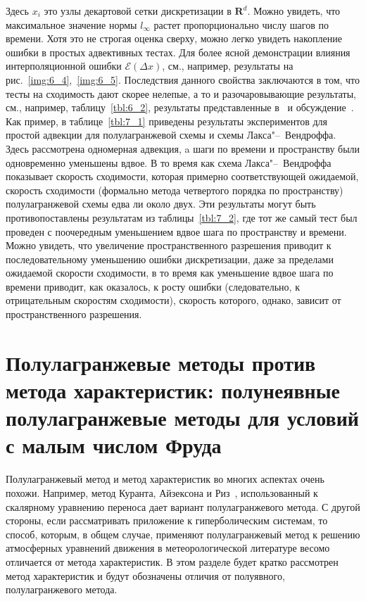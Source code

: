%
Здесь $x_i$ это узлы декартовой сетки дискретизации в $\mathbf{R}^d$. Можно увидеть, что максимальное значение нормы $l_{\infty}$ растет пропорционально числу шагов по времени. Хотя это не строгая оценка сверху, можно легко увидеть накопление ошибки в простых адвективных тестах. Для более ясной демонстрации влияния интерполяционной ошибки $\mathcal{E}(\Delta x)$, см., например, результаты на рис.~\ref{img:6_4},~\ref{img:6_5}. Последствия данного свойства заключаются в том, что тесты на сходимость дают скорее нелепые, а то и разочаровывающие результаты, см., например, таблицу~\ref{tbl:6_2}, результаты представленные в~\cite{A16} и обсуждение~\cite{A26}. Как пример, в таблице~\ref{tbl:7_1} приведены результаты экспериментов для простой адвекции для полулагранжевой схемы и схемы Лакса"--~Вендроффа. Здесь рассмотрена одномерная адвекция, a шаги по времени и пространству были одновременно уменьшены вдвое. В то время как схема Лакса"--~Вендроффа показывает скорость сходимости, которая примерно соответствующей ожидаемой, скорость сходимости (формально метода четвертого порядка по пространству) полулагранжевой схемы едва ли около двух. Эти результаты могут быть противопоставлены результатам из таблицы~\ref{tbl:7_2}, где тот же самый тест был проведен с поочередным уменьшением вдвое шага по пространству и времени. Можно увидеть, что увеличение пространственного разрешения приводит к последовательному уменьшению ошибки дискретизации, даже за пределами ожидаемой скорости сходимости, в то время как уменьшение вдвое шага по времени приводит, как оказалось, к росту ошибки (следовательно, к отрицательным скоростям сходимости), скорость которого, однако, зависит от пространственного разрешения.
\chapter{Полулагранжевые методы против метода характеристик: полунеявные полулагранжевые методы для условий с малым числом Фруда} \label{chapt_8}
Полулагранжевый метод и метод характеристик во многих аспектах очень похожи.
Например, метод  Куранта, Айзексона и Риз~\cite{A11}, использованный к скалярному уравнению переноса дает вариант полулагранжевого метода. С другой стороны, если рассматривать приложение к гиперболическим системам, то способ, которым, в общем случае, применяют полулагранжевый метод к решению атмосферных уравнений движения в метеорологической литературе весомо отличается от метода характеристик. В этом разделе будет кратко рассмотрен метод характеристик и будут обозначены отличия от полуявного, полулагранжевого метода.

